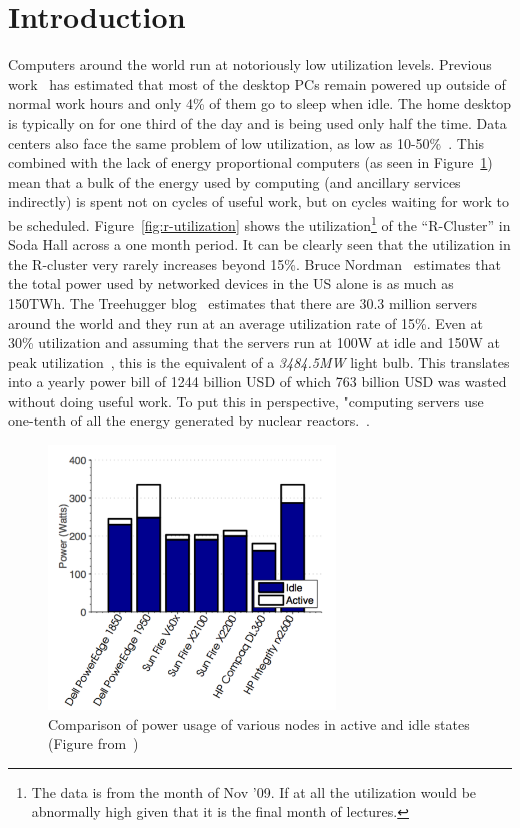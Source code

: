 \section{Introduction} %
\label{sec:introduction}
Computers around the world run at notoriously low utilization levels. Previous work~\cite{Kurt:07,Judy:04} has estimated that most of the desktop PCs remain powered up outside of normal work hours and only 4\% of them go to sleep when idle. The home desktop is typically on for one third of the day and is being used only half the time. Data centers also face the same problem of low utilization, as low as 10-50\%~\cite{Luiz:07,Albert:09}. This combined with the lack of energy proportional computers (as seen in Figure~\ref{fig:active-idle-power}) mean that a bulk of the energy used by computing (and ancillary services indirectly) is spent not on cycles of useful work, but on cycles waiting for work to be scheduled. Figure~\ref{fig:r-utilization} shows the utilization\footnote{The data is from the month of Nov '09. If at all the utilization would be abnormally high given that it is the final month of lectures.} of the ``R-Cluster'' in Soda Hall across a one month period. It can be clearly seen that the utilization in the R-cluster very rarely increases beyond 15\%. Bruce Nordman~\cite{Bruce:08} estimates that the total power used by networked devices in the US alone is as much as 150TWh. The Treehugger blog~\cite{TreeHugger:08} estimates that there are 30.3 million servers around the world and they run at an average utilization rate of 15\%. Even at 30\% utilization and assuming that the servers run at 100W at idle and 150W at peak utilization~\cite{Yuvraj:09}, this is the equivalent of a {\em 3484.5MW} light bulb. This translates into a yearly power bill of 1244 billion USD of which 763 billion USD was wasted without doing useful work. To put this in perspective, "computing servers use one-tenth of all the energy generated by nuclear reactors.~\cite{Robert:06}. 

\begin{figure}[ht]
\centering
\begin{center}
\includegraphics[width=3.0in]{graphs/steve-TR-idle-active.pdf}
\vspace{-0.1in}
\caption{{\normalsize Comparison of power usage of various nodes in active and idle states (Figure from~\cite{Dawson-Haggerty:09})}\label{fig:active-idle-power}}
\vspace{-0.1in}
\end{center}
\end{figure}


